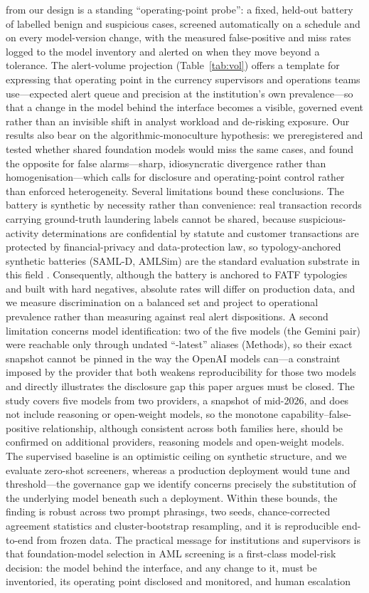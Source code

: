 \documentclass[lineno,pdflatex,sn-basic,Numbered]{sn-jnl}
\begin{document}
from our design is a standing ``operating-point probe'': a fixed, held-out battery of labelled benign and suspicious cases, screened automatically on a schedule and on every model-version change, with the measured false-positive and miss rates logged to the model inventory and alerted on when they move beyond a tolerance. The alert-volume projection (Table~\ref{tab:vol}) offers a template for expressing that operating point in the currency supervisors and operations teams use---expected alert queue and precision at the institution's own prevalence---so that a change in the model behind the interface becomes a visible, governed event rather than an invisible shift in analyst workload and de-risking exposure. Our results also bear on the algorithmic-monoculture hypothesis: we preregistered and tested whether shared foundation models would miss the same cases, and found the opposite for false alarms---sharp, idiosyncratic divergence rather than homogenisation---which calls for disclosure and operating-point control rather than enforced heterogeneity. Several limitations bound these conclusions. The battery is synthetic by necessity rather than convenience: real transaction records carrying ground-truth laundering labels cannot be shared, because suspicious-activity determinations are confidential by statute and customer transactions are protected by financial-privacy and data-protection law, so typology-anchored synthetic batteries (SAML-D, AMLSim) are the standard evaluation substrate in this field \cite{samld,amlsim}. Consequently, although the battery is anchored to FATF typologies and built with hard negatives, absolute rates will differ on production data, and we measure discrimination on a balanced set and project to operational prevalence rather than measuring against real alert dispositions. A second limitation concerns model identification: two of the five models (the Gemini pair) were reachable only through undated ``-latest'' aliases (Methods), so their exact snapshot cannot be pinned in the way the OpenAI models can---a constraint imposed by the provider that both weakens reproducibility for those two models and directly illustrates the disclosure gap this paper argues must be closed. The study covers five models from two providers, a snapshot of mid-2026, and does not include reasoning or open-weight models, so the monotone capability--false-positive relationship, although consistent across both families here, should be confirmed on additional providers, reasoning models and open-weight models. The supervised baseline is an optimistic ceiling on synthetic structure, and we evaluate zero-shot screeners, whereas a production deployment would tune and threshold---the governance gap we identify concerns precisely the substitution of the underlying model beneath such a deployment. Within these bounds, the finding is robust across two prompt phrasings, two seeds, chance-corrected agreement statistics and cluster-bootstrap resampling, and it is reproducible end-to-end from frozen data. The practical message for institutions and supervisors is that foundation-model selection in AML screening is a first-class model-risk decision: the model behind the interface, and any change to it, must be inventoried, its operating point disclosed and monitored, and human escalation 
\end{document}
